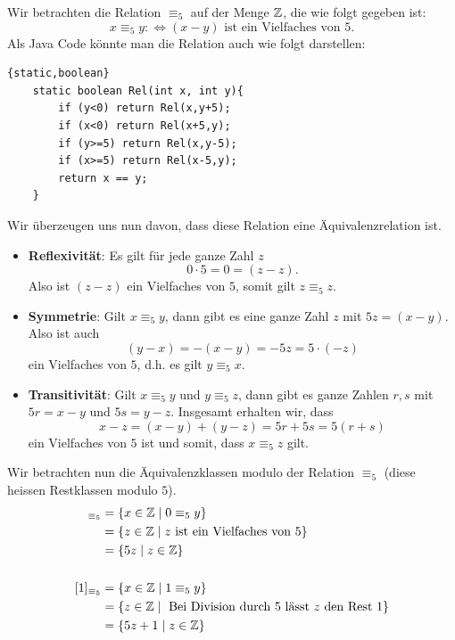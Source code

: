     \begin{bsp}\label{bsp:modulo5relation}
    Wir betrachten die Relation $\equiv_5$ auf der Menge $\mathbb{Z}$, die wie folgt gegeben ist:
    \[
    x\equiv_5 y:\Leftrightarrow (x-y)\text{ ist ein Vielfaches von  }5.
    \]
    Als Java Code könnte man die Relation auch wie folgt darstellen:

    \begin{framed}
        \begin{lstlisting}{static,boolean}
    static boolean Rel(int x, int y){
        if (y<0) return Rel(x,y+5);
        if (x<0) return Rel(x+5,y);
        if (y>=5) return Rel(x,y-5);
        if (x>=5) return Rel(x-5,y);
        return x == y;
    }
    \end{lstlisting}
    \end{framed}
    Wir überzeugen uns nun davon, dass diese Relation eine Äquivalenzrelation ist.
    \begin{itemize}
    \item \textbf{Reflexivität}: Es gilt für jede ganze Zahl $z$
    \[
    0\cdot 5=0=(z-z).
    \]
    Also ist $(z-z)$ ein Vielfaches von $5$, somit gilt $z\equiv_5 z$.
    \item\textbf{Symmetrie}: Gilt $x\equiv_5 y$, dann gibt es eine ganze Zahl $z$ mit $5z=(x-y)$. Also ist auch
    \[
    (y-x)=-(x-y)=-5z=5\cdot(-z)
    \]
    ein Vielfaches von $5$, d.h. es gilt $y\equiv_5x$.
    \item\textbf{Transitivität}: Gilt $x\equiv_5 y$ und $y\equiv_5 z$, dann gibt es ganze Zahlen $r,s$ mit $5r=x-y$ und $5s=y-z$. Insgesamt erhalten wir, dass
    \[
    x-z=(x-y)+(y-z)=5r+5s=5(r+s)
    \]
    ein Vielfaches von $5$ ist und somit, dass $x\equiv_5 z$ gilt.
    \end{itemize}
    Wir betrachten nun die Äquivalenzklassen modulo der Relation $\equiv_5$ (diese heissen Restklassen modulo $5$).
    \begin{align*}
    [0]_{\equiv_5}&=\{x\in \Z\mid 0\equiv_5y \}\\ &=\{z\in\Z\mid z\text{ ist ein Vielfaches von }5 \}\\
    &=\{5z\mid z\in\Z \}\\
    \phantom{dd}\\
    [1]_{\equiv_5}&=\{x\in \Z\mid 1\equiv_5y \}\\ &=\{z\in\Z\mid \text{ Bei Division durch }5\text{ lässt }z\text{ den Rest }1 \}\\
    &=\{5z+1\mid z\in\Z\}\\
    \phantom{dd}\\

\end{align*}
\end{bsp}
